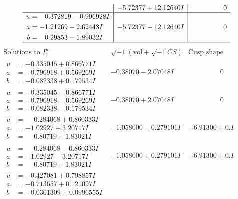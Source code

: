 \documentclass[1p]{elsarticle_modified}
\theoremstyle{definition}
\newcommand{\I}{\sqrt{-1}}
\begin{document}
$$\begin{array}{c|c|c}
 & -5.72377 + 12.12640 I & \phantom{-0.000000 } 0 \\ \hline\begin{aligned}
u &= \phantom{-}0.372819 - 0.996928 I \\
a &= -1.21269 - 2.62443 I \\
b &= \phantom{-}0.29853 - 1.89032 I\end{aligned}
 & -5.72377 - 12.12640 I & \phantom{-0.000000 } 0\\
 \hline 
 \end{array}$$\newpage$$\begin{array}{c|c|c}  
\text{Solutions to }I^u_{1}& \I (\text{vol} + \sqrt{-1}CS) & \text{Cusp shape}\\
 \hline 
\begin{aligned}
u &= -0.335045 + 0.866771 I \\
a &= -0.790918 + 0.569269 I \\
b &= -0.082338 + 0.179534 I\end{aligned}
 & -0.38070 - 2.07048 I & \phantom{-0.000000 } 0 \\ \hline\begin{aligned}
u &= -0.335045 - 0.866771 I \\
a &= -0.790918 - 0.569269 I \\
b &= -0.082338 - 0.179534 I\end{aligned}
 & -0.38070 + 2.07048 I & \phantom{-0.000000 } 0 \\ \hline\begin{aligned}
u &= \phantom{-}0.284068 + 0.860333 I \\
a &= -1.02927 + 3.20717 I \\
b &= \phantom{-}0.80719 + 1.83021 I\end{aligned}
 & -1.058000 - 0.279101 I & -6.91300 + 0. I\phantom{ +0.000000I} \\ \hline\begin{aligned}
u &= \phantom{-}0.284068 - 0.860333 I \\
a &= -1.02927 - 3.20717 I \\
b &= \phantom{-}0.80719 - 1.83021 I\end{aligned}
 & -1.058000 + 0.279101 I & -6.91300 + 0. I\phantom{ +0.000000I} \\ \hline\begin{aligned}
u &= -0.427081 + 0.798857 I \\
a &= -0.713657 + 0.121097 I \\
b &= -0.0301309 + 0.0996555 I\end{aligned}

\end{array}$$
\end{document}
